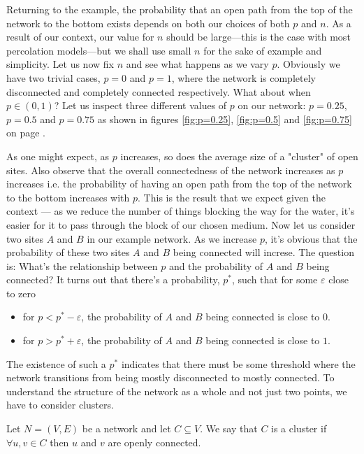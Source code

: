 Returning to the example, the probability that an open path from the top of the network to the bottom exists depends on both our choices of both $p$ and $n$. As a result of our context, our value for $n$ should be
large---this is the case with most percolation models---but we shall use small $n$ for the sake of example and simplicity. Let us now fix $n$ and see what happens as we vary $p$. Obviously we have two trivial cases, $p=0$ and $p=1$,
where the network is completely disconnected and completely connected respectively.
What about when $p\in(0,1)$? Let us inspect three different values of $p$ on our network: $p=0.25$, $p=0.5$ and $p=0.75$ as shown in figures \ref{fig:p=0.25}, \ref{fig:p=0.5} and
\ref{fig:p=0.75} on page \pageref{fig:probabilities}.

As one might expect, as $p$ increases, so does the average size of a "cluster" of open sites. Also observe that the overall connectedness of the network increases as $p$ increases
i.e. the probability of having an open path from the top of the network to the bottom increases with $p$. This is the result that we expect given the context --- as we reduce the
number of things blocking the way for the water, it's easier for it to pass through the block of our chosen medium. Now let us consider two sites $A$ and $B$ in our example
network. As we increase $p$, it's obvious that the probability of these two sites $A$ and $B$ being connected will increse. The question is: What's the relationship between $p$ and
the probability of $A$ and $B$ being connected? It turns out that there's a probability, $p^*$, such that for some $\varepsilon$ close to zero
\begin{itemize}
  \item for $p < p^* - \varepsilon$, the probability of $A$ and $B$ being connected is close to $0$.
  \item for $p > p^* + \varepsilon$, the probability of $A$ and $B$ being connected is close to $1$.
\end{itemize}

The existence of such a $p^*$ indicates that there must be some threshold where the network transitions from being mostly disconnected to mostly connected. To understand the
structure of the network as a whole and not just two points, we have to consider clusters.

\begin{definition}\label{def:cluster}
  Let $N = (V, E)$ be a network and let $C \subseteq V$. We say that $C$ is a cluster if $\forall u, v \in C$ then $u$ and $v$ are openly connected.
\end{definition}

